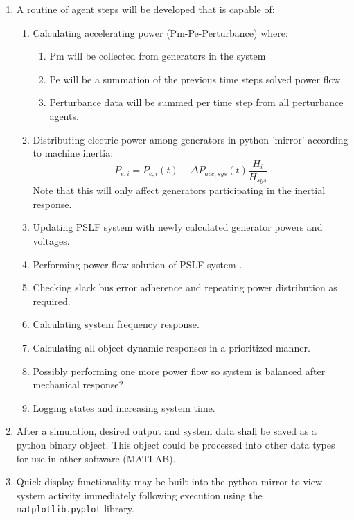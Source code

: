 \documentclass[12pt]{article}
\begin{document}
\begin{enumerate}
\item A routine of agent steps will be developed that is capable of:
	\begin{enumerate}
		\item Calculating accelerating power  (Pm-Pe-Perturbance) where:
		\begin{enumerate}
			\item Pm will be collected from generators in the system
			\item Pe will be a summation of the previous time steps solved power flow
			\item Perturbance data will be summed per time step from all perturbance agents.
		\end{enumerate}
		\item Distributing electric power among generators in python 'mirror' according to machine inertia:
		\[ P_{e,i} = P_{e,i}(t)-\Delta P_{acc,sys}(t)\dfrac{H_{i}}{H_{sys}} \]
		Note that this will only affect generators participating in the inertial response.
		\item Updating PSLF system with newly calculated generator powers and voltages.
		\item Performing power flow solution of PSLF system .
		\item Checking slack bus error adherence and repeating power distribution as required.
		\item Calculating system frequency response.
		\item Calculating all object dynamic responses in a prioritized manner.
		\item Possibly performing one more power flow so system is balanced after mechanical response?
		\item Logging states and increasing system time.
	\end{enumerate}
\item After a simulation, desired output and system data shall be saved as a python binary object. This object could be processed into other data types for use in other software (MATLAB).
\item Quick display functionality may be built into the python mirror to view system activity immediately following execution using the \verb|matplotlib.pyplot| library.
\end{enumerate}
\end{document}
